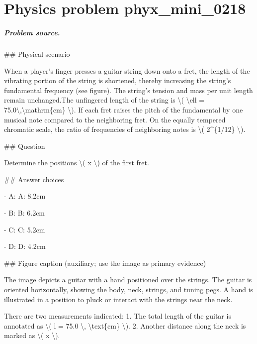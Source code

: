 
\chapter{Physics problem phyx\_mini\_0218}
\label{ch:PhyXMiniProblems_problem_phyx_mini_0218}

\paragraph{Problem source.}
\#\# Physical scenario

When a player's finger presses a guitar string down onto a fret, the length of the vibrating portion of the string is shortened, thereby increasing the string's fundamental frequency (see figure). The string's tension and mass per unit length remain unchanged.The unfingered length of the string is \textbackslash{}( \textbackslash{}ell = 75.0\textbackslash{},\textbackslash{}mathrm\{cm\} \textbackslash{}). If each fret raises the pitch of the fundamental by one musical note compared to the neighboring fret. On the equally tempered chromatic scale, the ratio of frequencies of neighboring notes is \textbackslash{}( 2\textasciicircum{}\{1/12\} \textbackslash{}).

\#\# Question

Determine the positions \textbackslash{}( x \textbackslash{}) of the first fret.

\#\# Answer choices

- A: A: 8.2cm

- B: B: 6.2cm

- C: C: 5.2cm

- D: D: 4.2cm

\#\# Figure caption (auxiliary; use the image as primary evidence)

The image depicts a guitar with a hand positioned over the strings. The guitar is oriented horizontally, showing the body, neck, strings, and tuning pegs. A hand is illustrated in a position to pluck or interact with the strings near the neck. 

There are two measurements indicated:
1. The total length of the guitar is annotated as \textbackslash{}( l = 75.0 \textbackslash{}, \textbackslash{}text\{cm\} \textbackslash{}).
2. Another distance along the neck is marked as \textbackslash{}( x \textbackslash{}).

